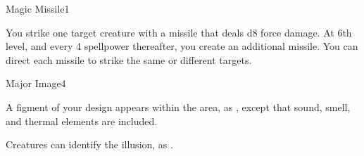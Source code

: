\begin{spellsection}{Magic Missile}{1}
    \begin{spellheader}
    \end{spellheader}
    \begin{spellcontent}
        \begin{spelltargetinginfo}
        \end{spelltargetinginfo}
        \begin{spelleffects}
            \spelleffect You strike one target creature with a missile that deals d8 force damage. At 6th level, and every 4 spellpower thereafter, you create an additional missile. You can direct each missile to strike the same or different targets.
        \end{spelleffects}
    \end{spellcontent}
    \begin{spellfooter}
        \spellnotes \forcespellnotes
        \miscastrandom
    \end{spellfooter}
\end{spellsection}

\begin{spellsection}{Major Image}{4}
    \begin{spellheader}
    \end{spellheader}
    \begin{spellcontent}
        \begin{spelltargetinginfo}
        \end{spelltargetinginfo}
        \begin{spelleffects}
            \spelleffect A figment of your design appears within the area, as , except that sound, smell, and thermal elements are included.
            \spelldur \durshort
        \end{spelleffects}
    \end{spellcontent}
    \begin{spellfooter}
        \spellnotes Creatures can identify the illusion, as .
        \miscastexplode
    \end{spellfooter}
\end{spellsection}

